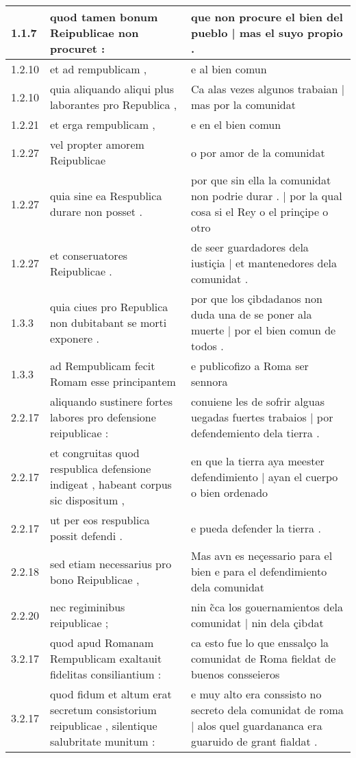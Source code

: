 \begin{tabular}{|p{1cm}|p{6.5cm}|p{6.5cm}|}

\hline
1.1.7 & quod tamen bonum Reipublicae non procuret : & que non procure el bien del pueblo | mas el suyo propio . \\\hline
1.2.10 & et ad rempublicam , & e al bien comun \\\hline
1.2.10 & quia aliquando aliqui plus laborantes pro Republica , & Ca alas vezes algunos trabaian | mas por la comunidat \\\hline
1.2.21 & et erga rempublicam , & e en el bien comun \\\hline
1.2.27 & vel propter amorem Reipublicae & o por amor de la comunidat \\\hline
1.2.27 & quia sine ea Respublica durare non posset . & por que sin ella la comunidat non podrie durar . | por la qual cosa si el Rey o el prinçipe o otro \\\hline
1.2.27 & et conseruatores Reipublicae . & de seer guardadores dela iustiçia | et mantenedores dela comunidat . \\\hline
1.3.3 & quia ciues pro Republica non dubitabant se morti exponere . & por que los çibdadanos non duda una de se poner ala muerte | por el bien comun de todos . \\\hline
1.3.3 & ad Rempublicam fecit Romam esse principantem & e publicofizo a Roma ser sennora \\\hline
2.2.17 & aliquando sustinere fortes labores pro defensione reipublicae : & conuiene les de sofrir alguas uegadas fuertes trabaios | por defendemiento dela tierra . \\\hline
2.2.17 & et congruitas quod respublica defensione indigeat , habeant corpus sic dispositum , & en que la tierra aya meester defendimiento | ayan el cuerpo o bien ordenado \\\hline
2.2.17 & ut per eos respublica possit defendi . & e pueda defender la tierra . \\\hline
2.2.18 & sed etiam necessarius pro bono Reipublicae , & Mas avn es neçessario para el bien e para el defendimiento dela comunidat \\\hline
2.2.20 & nec regiminibus reipublicae ; & nin c̃ca los gouernamientos dela comunidat | nin dela çibdat \\\hline
3.2.17 & quod apud Romanam Rempublicam exaltauit fidelitas consiliantium : & ca esto fue lo que enssalço la comunidat de Roma fieldat de buenos consseieros \\\hline
3.2.17 & quod fidum et altum erat secretum consistorium reipublicae , silentique salubritate munitum : & e muy alto era conssisto no secreto dela comunidat de roma | alos quel guardananca era guaruido de grant fialdat . \\\hline

\end{tabular}
